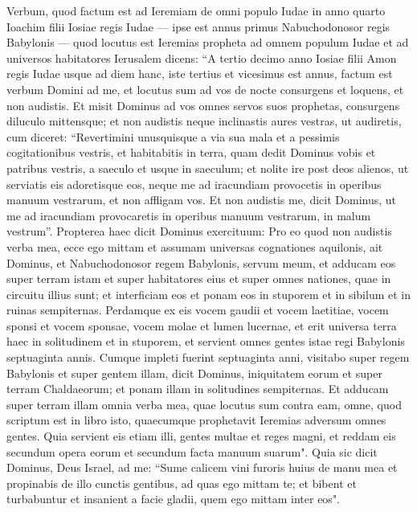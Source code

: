 \begin{biblechapter}  
\verse Verbum, quod factum est ad Ieremiam de omni populo Iudae in anno quarto Ioachim filii Iosiae regis Iudae — ipse est annus primus Nabuchodonosor regis Babylonis — 
\verse quod locutus est Ieremias propheta ad omnem populum Iudae et ad universos habitatores Ierusalem dicens: 
\verse “A tertio decimo anno Iosiae filii Amon regis Iudae usque ad diem hanc, iste tertius et vicesimus est annus, factum est verbum Domini ad me, et locutus sum ad vos de nocte consurgens et loquens, et non audistis. 
\verse Et misit Dominus ad vos omnes servos suos prophetas, consurgens diluculo mittensque; et non audistis neque inclinastis aures vestras, ut audiretis, 
\verse cum diceret: “Revertimini unusquisque a via sua mala et a pessimis cogitationibus vestris, et habitabitis in terra, quam dedit Dominus vobis et patribus vestris, a saeculo et usque in saeculum; 
\verse et nolite ire post deos alienos, ut serviatis eis adoretisque eos, neque me ad iracundiam provocetis in operibus manuum vestrarum, et non affligam vos. 
\verse Et non audistis me, dicit Dominus, ut me ad iracundiam provocaretis in operibus manuum vestrarum, in malum vestrum”. 
\verse Propterea haec dicit Dominus exercituum: Pro eo quod non audistis verba mea,  
\verse ecce ego mittam et assumam universas cognationes aquilonis, ait Dominus, et Nabuchodonosor regem Babylonis, servum meum, et adducam eos super terram istam et super habitatores eius et super omnes nationes, quae in circuitu illius sunt; et interficiam eos et ponam eos in stuporem et in sibilum et in ruinas sempiternas. 
\verse Perdamque ex eis vocem gaudii et vocem laetitiae, vocem sponsi et vocem sponsae, vocem molae et lumen lucernae, 
\verse et erit universa terra haec in solitudinem et in stuporem, et servient omnes gentes istae regi Babylonis septuaginta annis. 
\verse Cumque impleti fuerint septuaginta anni, visitabo super regem Babylonis et super gentem illam, dicit Dominus, iniquitatem eorum et super terram Chaldaeorum; et ponam illam in solitudines sempiternas.  
\verse Et adducam super terram illam omnia verba mea, quae locutus sum contra eam, omne, quod scriptum est in libro isto, quaecumque prophetavit Ieremias adversum omnes gentes. 
\verse Quia servient eis etiam illi, gentes multae et reges magni, et reddam eis secundum opera eorum et secundum facta manuum suarum". 
\verse Quia sic dicit Dominus, Deus Israel, ad me: “Sume calicem vini furoris huius de manu mea et propinabis de illo cunctis gentibus, ad quas ego mittam te; 
\verse et bibent et turbabuntur et insanient a facie gladii, quem ego mittam inter eos". 

\end{biblechapter}
